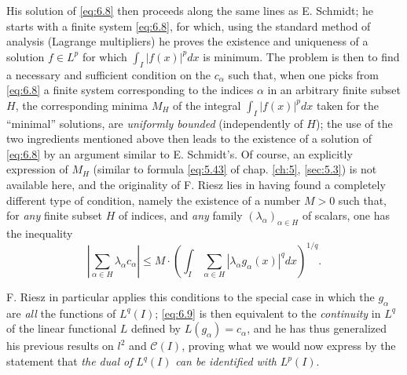 \documentclass[12pt,a4paper,leqno,twoside]{extbook}
\newcommand{\Cont}{\mathcal{C}}
\begin{document}
His solution of \eqref{eq:6.8} then proceeds along the same lines as E. Schmidt; he starts with a finite system \eqref{eq:6.8}, for which, using the standard method of analysis (Lagrange multipliers) he proves the existence and uniqueness of a solution \(f \in L^p\) for which \(\int_I |f(x)|^p dx\) is minimum. The problem is then to find a necessary and sufficient condition on the \(c_\alpha\) such that, when one picks from \eqref{eq:6.8} a finite system corresponding to the indices \(\alpha\) in an arbitrary finite subset \(H\), the corresponding minima \(M_H\) of the integral \(\int_I |f(x)|^p dx\) taken for the ``minimal'' solutions, are \emph{uniformly bounded} (independently of \(H\)); the use of the two ingredients mentioned above then leads to the existence of a solution of \eqref{eq:6.8} by an argument similar to E. Schmidt's. Of course, an explicitly expression of \(M_H\) (similar to formula \eqref{eq:5.43} of chap. \ref{ch:5}, \ref{sec:5.3}) is not available here, and the originality of F. Riesz lies in having found a completely different type of condition, namely the existence of a number \(M > 0\) such that, for \emph{any} finite subset \(H\) of indices, and \emph{any} family \((\lambda_\alpha)_{\alpha \in H}\) of scalars, one has the inequality
\begin{equation}
    \label{eq:6.9}
    \left| \sum_{\alpha \in H} \lambda_\alpha c_\alpha \right| \leq M \cdot \left( \int_I \, \sum_{\alpha \in H} |\lambda_\alpha g_\alpha(x)|^q dx \right)^{1 / q}.
\end{equation}

F. Riesz in particular applies this conditions to the special case in which the \(g_\alpha\) are \emph{all} the functions of \(L^q(I)\); \eqref{eq:6.9} is then equivalent to the \emph{continuity} in \(L^q\) of the linear functional \(L\) defined by \(L(g_\alpha) = c_\alpha\), and he has thus generalized his previous results on \(l^2\) and \(\Cont(I)\), proving what we would now express by the statement that \emph{the dual of} \(L^q(I)\) \emph{can be identified with} \(L^p(I)\).
\end{document}
